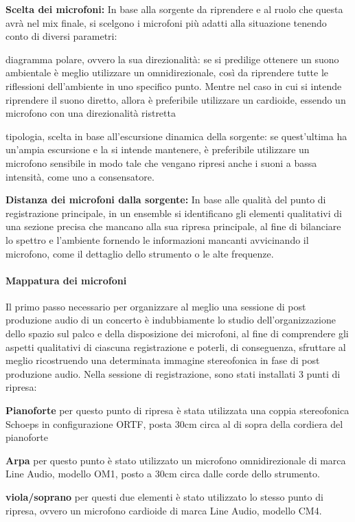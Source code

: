 	\begin{compactitem}
		\item \textbf{Scelta dei microfoni:} In base alla sorgente da riprendere e al ruolo che questa avrà nel mix finale, si scelgono i microfoni più adatti alla situazione tenendo conto di diversi parametri:
			\begin{compactitem}
				\item diagramma polare, ovvero la sua direzionalità: se si predilige ottenere un suono ambientale è meglio utilizzare un omnidirezionale, così da riprendere tutte le riflessioni dell'ambiente in uno specifico punto. Mentre nel caso in cui si intende riprendere il suono diretto, allora è preferibile utilizzare un cardioide, essendo un microfono con una direzionalità ristretta
				\item tipologia, scelta in base all'escursione dinamica della sorgente: se quest'ultima ha un'ampia escursione e la si intende mantenere, è preferibile utilizzare un microfono sensibile in modo tale che vengano ripresi anche i suoni a bassa intensità, come uno a consensatore.
			\end{compactitem}
		\item \textbf{Distanza dei microfoni dalla sorgente:} In base alle qualità del punto di registrazione principale, in un ensemble si identificano gli elementi qualitativi di una sezione precisa che mancano alla sua ripresa principale, al fine di bilanciare lo spettro e l'ambiente fornendo le informazioni mancanti avvicinando il microfono, come il dettaglio dello strumento o le alte frequenze.
	\end{compactitem}
	
	\paragraph{Mappatura dei microfoni}
	Il primo passo necessario per organizzare al meglio una sessione di post produzione audio di un concerto è indubbiamente lo studio dell'organizzazione dello spazio sul palco e della disposizione dei microfoni, al fine di comprendere gli aspetti qualitativi di ciascuna registrazione e poterli, di conseguenza, sfruttare al meglio ricostruendo una determinata immagine stereofonica in fase di post produzione audio.
	Nella sessione di registrazione, sono stati installati 3 punti di ripresa:
		\begin{compactitem}
			\item \textbf{Pianoforte} per questo punto di ripresa è stata utilizzata una coppia stereofonica Schoeps in configurazione ORTF, posta 30cm circa al di sopra della cordiera del pianoforte
			\item \textbf{Arpa} per questo punto è stato utilizzato un microfono omnidirezionale di marca Line Audio, modello OM1, posto a 30cm circa dalle corde dello strumento.
			\item \textbf{viola/soprano} per questi due elementi è stato utilizzato lo stesso punto di ripresa, ovvero un microfono cardioide di marca Line Audio, modello CM4.
		\end{compactitem}
	
